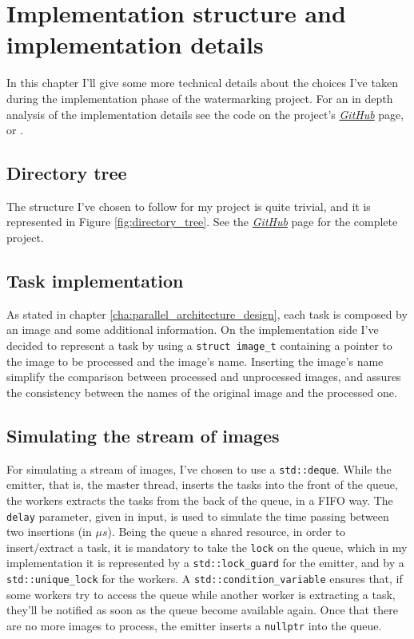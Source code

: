 \chapter{Implementation structure and implementation details} %
\label{cha:implementation_structure_and_implementation_details}
    In this chapter I'll give some more technical details about the choices I've taken during the implementation
    phase of the watermarking project. For an in depth analysis of the implementation details see the code on the
    project's \href{https://github.com/germz01/PDS_project}{\textit{GitHub}} page, or \cite{cpp}.
    \section{Directory tree} %
    \label{sec:directory_tree}
        The structure I've chosen to follow for my project is quite trivial, and it is represented in Figure
        \ref{fig:directory_tree}. See the \href{https://github.com/germz01/PDS_project}{\textit{GitHub}} page
        for the complete project.
    \section{Task implementation} %
    \label{sec:task_implementation}
        As stated in chapter \ref{cha:parallel_architecture_design}, each task is composed by an image and some
        additional information. On the implementation side I've decided to represent a task by using a
        \texttt{struct image\_t} containing a pointer to the image to be processed and the image's name.
        Inserting the image's name simplify the comparison between processed and unprocessed images, and assures
        the consistency between the names of the original image and the processed one.
    \section{Simulating the stream of images} %
    \label{sec:simulating_the_stream_of_images}
        For simulating a stream of images, I've chosen to use a \texttt{std::deque}. While the emitter,
        that is, the master thread, inserts the tasks into the front of the queue, the workers extracts the tasks
        from the back of the queue, in a FIFO way. The \texttt{delay} parameter, given in input, is used to
        simulate the time passing between two insertions (in $\mu s$). Being the queue a shared resource,
        in order to insert/extract a task, it is mandatory to take the \texttt{lock} on the queue, which in my
        implementation it is represented by a \texttt{std::lock\_guard} for the emitter, and by a
        \texttt{std::unique\_lock} for the workers. A \texttt{std::condition\_variable} ensures that, if some
        workers try to access the queue while another worker is extracting a task, they'll be notified as soon as
        the queue become available again. Once that there are no more images to process, the emitter inserts a
        \texttt{nullptr} into the queue.
